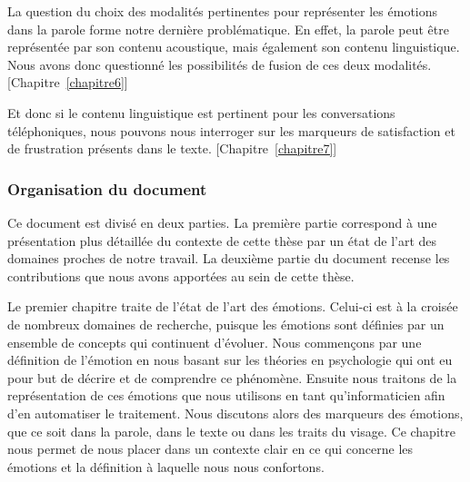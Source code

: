 La question du choix des modalités pertinentes pour représenter les émotions dans la parole forme notre dernière problématique. En effet, la parole peut être représentée par son contenu acoustique, mais également son contenu linguistique. Nous avons donc questionné les possibilités de fusion de ces deux modalités. [Chapitre~\ref{chapitre6}]

Et donc si le contenu linguistique est pertinent pour les conversations téléphoniques, nous pouvons nous interroger sur les marqueurs de satisfaction et de frustration présents dans le texte. [Chapitre~\ref{chapitre7}]
%

\subsubsection{Organisation du document}

Ce document est divisé en deux parties. La première partie correspond à une présentation plus détaillée du contexte de cette thèse par un état de l'art des domaines proches de notre travail. La deuxième partie du document recense les contributions que nous avons apportées au sein de cette thèse.

Le premier chapitre traite de l'état de l'art des émotions. Celui-ci est à la croisée de nombreux domaines de recherche, puisque les émotions sont définies par un ensemble de concepts qui continuent d'évoluer. Nous commençons par une définition de l'émotion en nous basant sur les théories en psychologie qui ont eu pour but de décrire et de comprendre ce phénomène. Ensuite nous traitons de la représentation de ces émotions que nous utilisons en tant qu'informaticien afin d'en automatiser le traitement. Nous discutons alors des marqueurs des émotions, que ce soit dans la parole, dans le texte ou dans les traits du visage. Ce chapitre nous permet de nous placer dans un contexte clair en ce qui concerne les émotions et la définition à laquelle nous nous confortons.

